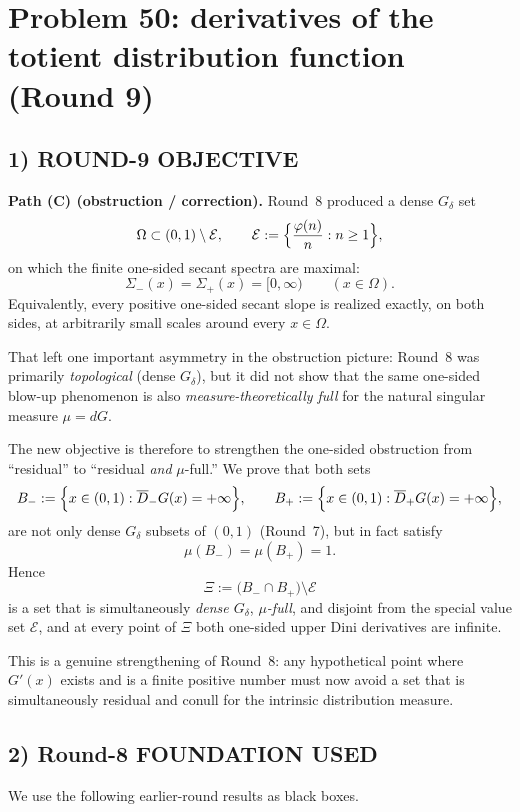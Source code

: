 \section{Problem 50: derivatives of the totient distribution function (Round 9)}

\subsection{1) ROUND-9 OBJECTIVE}

\textbf{Path (C) (obstruction / correction).}
Round~8 produced a dense $G_\delta$ set
\[
\Omega\subset (0,1)\setminus\mathcal E,
\qquad
\mathcal E:=\Bigl\{\frac{\varphi(n)}{n}:n\ge 1\Bigr\},
\]
on which the finite one-sided secant spectra are maximal:
\[
\Sigma_-(x)=\Sigma_+(x)=[0,\infty)
\qquad(x\in\Omega).
\]
Equivalently, every positive one-sided secant slope is realized exactly, on both sides, at arbitrarily small scales around every $x\in\Omega$.

That left one important asymmetry in the obstruction picture: Round~8 was primarily \emph{topological} (dense $G_\delta$), but it did not show that the same one-sided blow-up phenomenon is also \emph{measure-theoretically full} for the natural singular measure $\mu=dG$.

The new objective is therefore to strengthen the one-sided obstruction from ``residual'' to ``residual \emph{and} $\mu$-full.''
We prove that both sets
\[
B_-:=\Bigl\{x\in(0,1):\overline D_-G(x)=+\infty\Bigr\},
\qquad
B_+:=\Bigl\{x\in(0,1):\overline D_+G(x)=+\infty\Bigr\},
\]
are not only dense $G_\delta$ subsets of $(0,1)$ (Round~7), but in fact satisfy
\[
\mu(B_-)=\mu(B_+)=1.
\]
Hence
\[
\Xi:=\bigl(B_-\cap B_+\bigr)\setminus\mathcal E
\]
is a set that is simultaneously \emph{dense $G_\delta$}, \emph{$\mu$-full}, and disjoint from the special value set $\mathcal E$, and at every point of $\Xi$ both one-sided upper Dini derivatives are infinite.

This is a genuine strengthening of Round~8: any hypothetical point where $G'(x)$ exists and is a finite positive number must now avoid a set that is simultaneously residual and conull for the intrinsic distribution measure.

\subsection{2) Round-8 FOUNDATION USED}

We use the following earlier-round results as black boxes.

